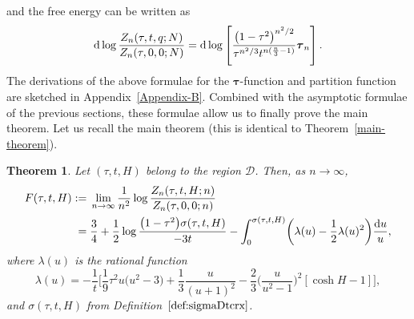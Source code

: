 \documentclass[pdftex]{sigma}
\numberwithin{equation}{section}
\newtheorem*{Theorem*}{Theorem}
\begin{document}
 and the free energy can be written as
 \begin{equation*}
 {\rm d}\log \frac{Z_{n}(\tau,t,q;N)}{Z_{n}(\tau,0,0;N)} = {\rm d}\log \left[\frac{\bigl(1-\tau^2\bigr)^{n^2/2}}{\tau^{n^2/3}t^{n(\frac{n}{3}-1)}}\boldsymbol{\tau}_n\right].
 \end{equation*}
The derivations of the above formulae for the $\boldsymbol{\tau}$-function and partition function are sketched in Appendix~\ref{Appendix-B}. Combined with the asymptotic formulae of the previous sections, these formulae allow us to finally prove the main theorem. Let us recall the main theorem (this is identical to Theorem~\ref{main-theorem}).

\begin{Theorem*}
 Let $(\tau,t,H)$ belong to the region $\mathcal D$. Then, as $n\to \infty$,
 \begin{align*}
 F(\tau,t,H):={}&\lim_{n\to \infty} \frac{1}{n^2}\log \frac{ Z_{n}(\tau,t,H;n) }{ Z_{n}(\tau,0,0;n)} \\
={}& \frac{3}{4} + \frac{1}{2}\log \frac{\bigl(1-\tau^2\bigr)\sigma(\tau,t,H)}{-3t} - \int_{0}^{\sigma(\tau,t,H)}\biggl(\lambda(u)-\frac{1}{2}\lambda(u)^2\biggr) \frac{{\rm d}u}{u},
\end{align*}
 where $\lambda(u)$ is the rational function
 \begin{equation*}
 \lambda(u) = -\frac{1}{t}\biggl[\frac{1}{9}\tau^2u\bigl(u^2-3\bigr) + \frac{1}{3}\frac{u}{(u+1)^2} - \frac{2}{3}\biggl(\frac{u}{u^2-1}\biggr)^2[\cosh H -1]\biggr],
 \end{equation*}
 and $\sigma(\tau,t,H)$ from Definition~$\ref{def:sigmaDtcrx}$.
 \end{Theorem*}
\end{document}
